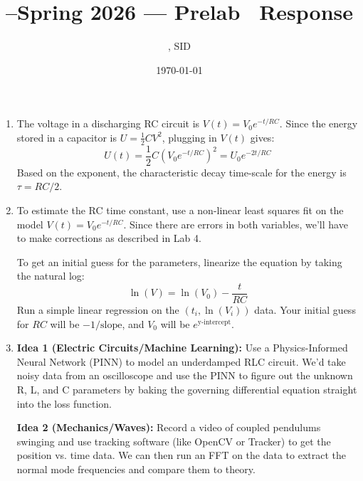 \documentclass[11pt]{article}
\title{\Cls--Spring 2026 --- Prelab \Prelab \ Response}
\author{\Name, SID \SID}
\date{\today}
\begin{document}
\maketitle

\begin{enumerate}

    \item
          The voltage in a discharging RC circuit is $V(t) = V_0 e^{-t/RC}$.
          Since the energy stored in a capacitor is $U = \frac{1}{2}CV^2$, plugging in $V(t)$ gives:
          \[ U(t) = \frac{1}{2}C \left(V_0 e^{-t/RC}\right)^2 = U_0 e^{-2t/RC} \]
          Based on the exponent, the characteristic decay time-scale for the energy is $\tau = RC/2$.

    \item
          To estimate the RC time constant, use a non-linear least squares fit on the model $V(t) = V_0 e^{-t/RC}$. Since there are errors in both variables, we'll have to make corrections as described in Lab 4.

          To get an initial guess for the parameters, linearize the equation by taking the natural log:
          \[ \ln(V) = \ln(V_0) - \frac{t}{RC} \]
          Run a simple linear regression on the $(t_i, \ln(V_i))$ data. Your initial guess for $RC$ will be $-1/\text{slope}$, and $V_0$ will be $e^{\text{y-intercept}}$.

    \item
          \textbf{Idea 1 (Electric Circuits/Machine Learning):} Use a Physics-Informed Neural Network (PINN) to model an underdamped RLC circuit. We'd take noisy data from an oscilloscope and use the PINN to figure out the unknown R, L, and C parameters by baking the governing differential equation straight into the loss function.

          \textbf{Idea 2 (Mechanics/Waves):} Record a video of coupled pendulums swinging and use tracking software (like OpenCV or Tracker) to get the position vs. time data. We can then run an FFT on the data to extract the normal mode frequencies and compare them to theory.

\end{enumerate}
\end{document}
